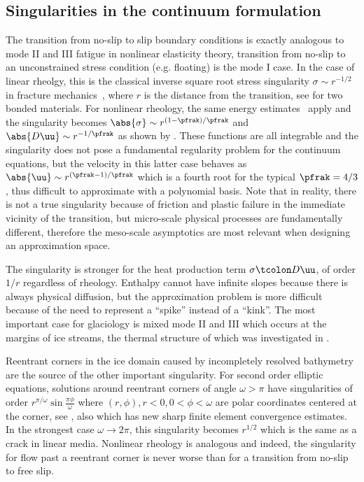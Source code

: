 \subsection{Singularities in the continuum formulation}
The transition from no-slip to slip boundary conditions is exactly analogous to mode II and III fatigue in nonlinear elasticity theory, transition from no-slip to an unconstrained stress condition (e.g. floating) is the mode I case.
In the case of linear rheolgy, this is the classical inverse square root stress singularity $\sigma \sim r^{-1/2}$ in fracture mechanics~\citep{anderson2005fracture}, where $r$ is the distance from the transition, see \citet{erdogan1973two} for two bonded materials.
For nonlinear rheology, the same energy estimates~\citep{rice1968path} apply and the singularity becomes $\abs{\sigma} \sim r^{(1-\pfrak)/\pfrak}$ and $\abs{D\uu} \sim r^{-1/\pfrak}$ as shown by \citet{rice1968plane,hutchinson1968singular}. 
These functions are all integrable and the singularity does not pose a fundamental regularity problem for the continuum equations, but the velocity in this latter case behaves as $\abs{\uu} \sim r^{(\pfrak-1)/\pfrak}$ which is a fourth root for the typical $\pfrak = 4/3$, thus difficult to approximate with a polynomial basis.
Note that in reality, there is not a true singularity because of friction and plastic failure in the immediate vicinity of the transition, but micro-scale physical processes are fundamentally different, therefore the meso-scale asymptotics are most relevant when designing an approximation space.

The singularity is stronger for the heat production term $\sigma\tcolon D\uu$, of order $1/r$ regardless of rheology.
Enthalpy cannot have infinite slopes because there is always physical diffusion, but the approximation problem is more difficult because of the need to represent a ``spike'' instead of a ``kink''.
The most important case for glaciology is mixed mode II and III which occurs at the margins of ice streams, the thermal structure of which was investigated in \citet{jacobson1998thermal,raymond2000energy}.

Reentrant corners in the ice domain caused by incompletely resolved bathymetry are the source of the other important singularity.
For second order elliptic equations, solutions around reentrant corners of angle $\omega > \pi$ have singularities of order $r^{\pi/\omega}\sin\frac{\pi\phi}{\omega}$ where $(r,\phi), r < 0, 0 < \phi < \omega$ are polar coordinates centered at the corner, see \citet{grisvard1985elliptic,nazarov1994elliptic}, also \citet{bacuta2003regularity} which has new sharp finite element convergence estimates.
In the strongest case $\omega\to 2\pi$, this singularity becomes $r^{1/2}$ which is the same as a crack in linear media.
Nonlinear rheology is analogous and indeed, the singularity for flow past a reentrant corner is never worse than for a transition from no-slip to free slip.

